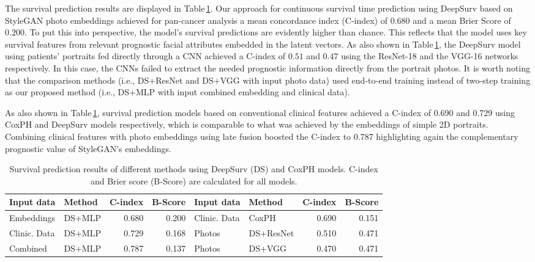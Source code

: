 \documentclass[runningheads]{llncs}
\begin{document}
The survival prediction results are displayed in Table\,\ref{Tab:accuracy}. 
Our approach for continuous survival time prediction using DeepSurv based on StyleGAN photo embeddings achieved for pan-cancer analysis a mean concordance index (C-index) of $0.680$ and a mean Brier Score of $0.200$. 
To put this into perspective, the model's survival predictions are evidently higher than chance. 
This reflects that the model uses key survival features from relevant prognostic facial attributes embedded in the latent vectors. 
As also shown in Table\,\ref{Tab:accuracy}, the DeepSurv model using patients' portraits fed directly through a CNN achieved a C-index of $0.51$ and $0.47$ using the ResNet-18 and the VGG-16 networks respectively.
In this case, the CNNs failed to extract the needed prognostic information directly from the portrait photos. It is worth noting that the comparison methods (i.e., DS+ResNet and DS+VGG with input photo data) used end-to-end training instead of two-step training as our proposed method (i.e., DS+MLP with input combined embedding and clinical data).

As also shown in Table\,\ref{Tab:accuracy}, survival prediction models based on conventional clinical features achieved a C-index of 0.690 and 0.729 using CoxPH and DeepSurv models respectively, which is comparable to what was achieved by the embeddings of simple 2D portraits. 
Combining clinical features with photo embeddings using late fusion boosted the C-index to 0.787 highlighting again the complementary prognostic value of StyleGAN's embeddings. 


\begin{table}[t]
\caption{Survival prediction results of different methods using DeepSurv (DS) and CoxPH models. C-index and Brier score (B-Score) are calculated for all models.}
\label{Tab:accuracy}
\centering
\begin{tabular}{l|l r r||l| l r r}
\hline
\textbf{Input data}& \textbf{Method} & \textbf{C-index} & \textbf{B-Score} & \textbf{Input data} & \textbf{Method} & \textbf{C-index} & \textbf{B-Score} \\
\hline
Embeddings & DS+MLP &0.680 & 0.200 & Clinic. Data & CoxPH & 0.690 & 0.151\\ 
 
 Clinic. Data&DS+MLP  & 0.729 & 0.168 &Photos& DS+ResNet& 0.510 & 0.471\\
Combined& DS+MLP& 0.787 & 0.137 &Photos &DS+VGG & 0.470 & 0.471 \\
\hline
\end{tabular}
\end{table}
\end{document}
